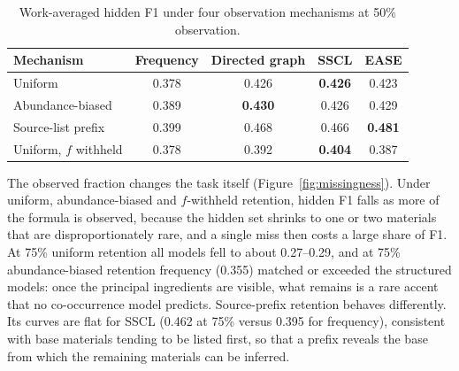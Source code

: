 \documentclass[applsci,article,submit,oneauthor]{Definitions/mdpi}
\begin{document}
\begin{table}[H]
\caption{Work-averaged hidden F1 under four observation mechanisms at 50\% observation.}
\label{tab:missing}
\small
\begin{tabularx}{\textwidth}{lCCCC}
\toprule
\textbf{Mechanism} & \textbf{Frequency} & \textbf{Directed graph} & \textbf{SSCL} & \textbf{EASE} \\
\midrule
Uniform & 0.378 & 0.426 & \textbf{0.426} & 0.423 \\
Abundance-biased & 0.389 & \textbf{0.430} & 0.426 & 0.429 \\
Source-list prefix & 0.399 & 0.468 & 0.466 & \textbf{0.481} \\
Uniform, $f$ withheld & 0.378 & 0.392 & \textbf{0.404} & 0.387 \\
\bottomrule
\end{tabularx}
\end{table}

The observed fraction changes the task itself (Figure~\ref{fig:missingness}). Under uniform, abundance-biased and $f$-withheld retention, hidden F1 falls as more of the formula is observed, because the hidden set shrinks to one or two materials that are disproportionately rare, and a single miss then costs a large share of F1. At 75\% uniform retention all models fell to about 0.27--0.29, and at 75\% abundance-biased retention frequency (0.355) matched or exceeded the structured models: once the principal ingredients are visible, what remains is a rare accent that no co-occurrence model predicts. Source-prefix retention behaves differently. Its curves are flat for SSCL (0.462 at 75\% versus 0.395 for frequency), consistent with base materials tending to be listed first, so that a prefix reveals the base from which the remaining materials can be inferred.
\end{document}
